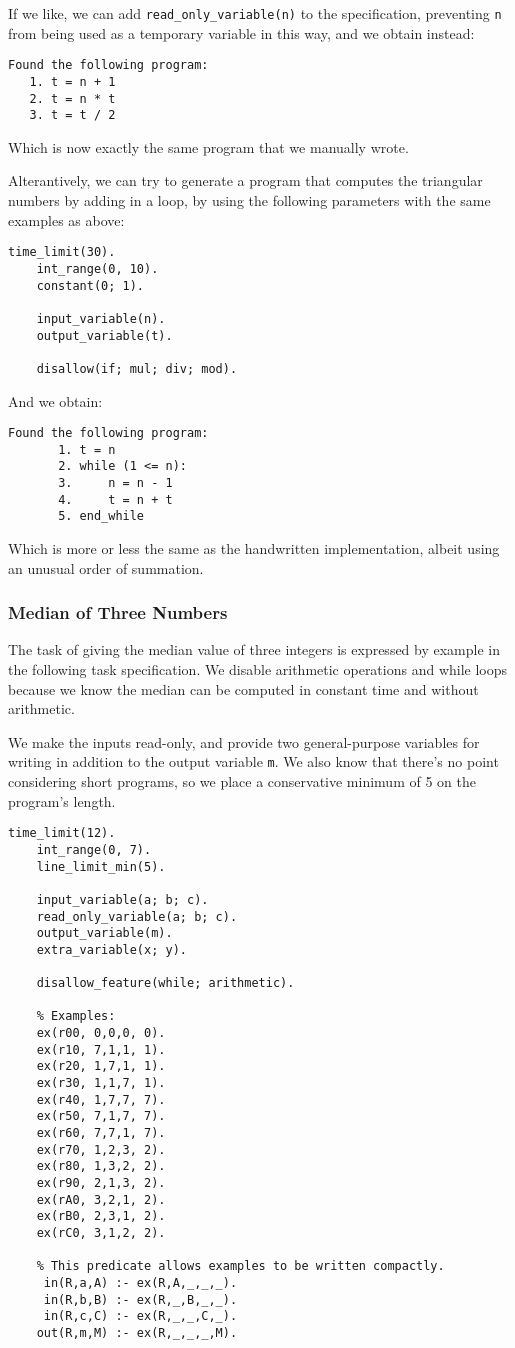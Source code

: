 \documentclass[a4paper,twoside,notitlepage]{report}
\begin{document}
If we like, we can add \verb|read_only_variable(n)| to the specification, 
preventing \verb|n| from being used as a temporary variable in this way, 
and we obtain instead:
\begin{Verbatim}[samepage=true]
Found the following program:
   1. t = n + 1
   2. t = n * t
   3. t = t / 2
\end{Verbatim}
Which is now exactly the same program that we manually wrote.

Alterantively, we can try to generate a program that computes the 
triangular numbers by adding in a loop, by using the following parameters 
with the same examples as above:
\begin{Verbatim}[samepage=true]
    time_limit(30).
    int_range(0, 10).
    constant(0; 1).
    
    input_variable(n).
    output_variable(t).
    
    disallow(if; mul; div; mod).
\end{Verbatim}
And we obtain:
\begin{Verbatim}[samepage=true]
    Found the following program:
       1. t = n
       2. while (1 <= n):
       3.     n = n - 1
       4.     t = n + t
       5. end_while
\end{Verbatim}
Which is more or less the same as the handwritten implementation, albeit 
using an unusual order of summation.

\subsubsection{Median of Three Numbers}
The task of giving the median value of three integers is expressed by 
example in the following task specification. We disable arithmetic 
operations and while loops because we know the median can be computed in 
constant time and without arithmetic. 

We make the inputs read-only, and provide two general-purpose variables 
for writing in addition to the output variable \verb|m|. We also know that 
there's no point considering short programs, so we place a conservative 
minimum of 5 on the program's length.

\begin{Verbatim}[samepage=true]
    time_limit(12).
    int_range(0, 7).
    line_limit_min(5).
    
    input_variable(a; b; c).
    read_only_variable(a; b; c).
    output_variable(m).
    extra_variable(x; y).
    
    disallow_feature(while; arithmetic).
    
    % Examples:
    ex(r00, 0,0,0, 0).
    ex(r10, 7,1,1, 1).
    ex(r20, 1,7,1, 1).
    ex(r30, 1,1,7, 1).
    ex(r40, 1,7,7, 7).
    ex(r50, 7,1,7, 7).
    ex(r60, 7,7,1, 7).
    ex(r70, 1,2,3, 2).
    ex(r80, 1,3,2, 2).
    ex(r90, 2,1,3, 2).
    ex(rA0, 3,2,1, 2).
    ex(rB0, 2,3,1, 2).
    ex(rC0, 3,1,2, 2).
    
    % This predicate allows examples to be written compactly.
     in(R,a,A) :- ex(R,A,_,_,_).
     in(R,b,B) :- ex(R,_,B,_,_).
     in(R,c,C) :- ex(R,_,_,C,_).
    out(R,m,M) :- ex(R,_,_,_,M).
\end{Verbatim}
\end{document}
